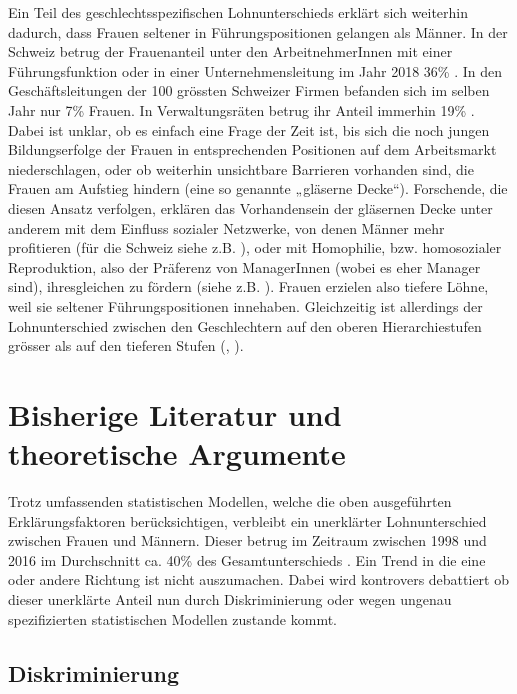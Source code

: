 \documentclass[a4paper,12pt]{article}
\renewcommand{\baselinestretch}{1.1}
\newif\ifcomments
\newcommand{\comment}[1]{%
    \ifcomments\marginpar{\renewcommand{\baselinestretch}{1}\tiny\hspace*{-1.1em}\colorbox{gray!20}%
    {\textcolor{red}{\parbox[t]{.9in}{\raggedright #1}}}}\fi}
\begin{document}
Ein Teil des geschlechtsspezifischen Lohnunterschieds erklärt sich weiterhin dadurch, dass Frauen
seltener in Führungspositionen gelangen als Männer. In der Schweiz betrug der
Frauenanteil unter den ArbeitnehmerInnen mit einer Führungsfunktion oder in
einer Unternehmensleitung im Jahr 2018 36\% \citep{BFS-2019c}. In den
Geschäftsleitungen der 100 grössten Schweizer Firmen befanden sich im selben
Jahr nur 7\% Frauen. In Verwaltungsräten betrug ihr Anteil immerhin 19\%
\citep{Schillingreport-2018}. Dabei ist unklar, ob es einfach eine Frage der
Zeit ist, bis sich die noch jungen Bildungserfolge der Frauen in entsprechenden
Positionen auf dem Arbeitsmarkt niederschlagen, oder ob weiterhin unsichtbare
Barrieren vorhanden sind, die Frauen am Aufstieg hindern (eine so genannte
„gläserne Decke“). Forschende, die diesen Ansatz verfolgen, erklären das
Vorhandensein der gläsernen Decke unter anderem mit dem Einfluss sozialer
Netzwerke, von denen Männer mehr profitieren (für die Schweiz siehe z.B.
\citealp{Rost-2010}), oder mit Homophilie, bzw. homosozialer Reproduktion, also
der Präferenz von ManagerInnen (wobei es eher Manager sind), ihresgleichen zu
fördern (siehe z.B. \citealp{Bihagen-Ohls-2006,Holst-Wiemer-2010,Ochsenfeld-2012}). Frauen erzielen
also tiefere Löhne, weil sie seltener Führungspositionen innehaben.
Gleichzeitig ist allerdings der Lohnunterschied zwischen den Geschlechtern auf
den oberen Hierarchiestufen grösser als auf den tieferen Stufen
(\citealp{Blau-Kahn-2016}, \citealp[42]{Strub-Bannwart-2017}).

\section{Bisherige Literatur und theoretische Argumente}
\label{sec:s2}

Trotz umfassenden statistischen Modellen, welche die oben ausgeführten Erklärungsfaktoren berücksichtigen, verbleibt ein unerklärter Lohnunterschied zwischen Frauen und Männern. Dieser betrug im Zeitraum zwischen 1998 und 2016 im Durchschnitt ca. 40\% des Gesamtunterschieds \citep{BFS-2019a,Strub-2010}. Ein Trend in die eine oder andere Richtung ist nicht auszumachen. Dabei wird kontrovers debattiert ob dieser unerklärte Anteil nun durch Diskriminierung oder wegen ungenau spezifizierten statistischen Modellen zustande kommt.
\comment{Überleitung}

\subsection{Diskriminierung}
\label{sec:ss2}
\comment{Abschnitt wurde neu überarbeitet}
\end{document}
